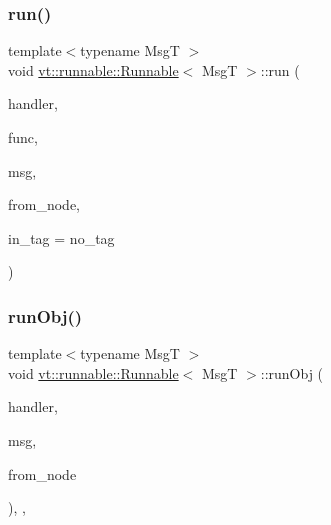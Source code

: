 \subsubsection{\texorpdfstring{run()}{run()}}
{\footnotesize\ttfamily template$<$typename MsgT $>$ \\
void \hyperlink{structvt_1_1runnable_1_1_runnable}{vt\+::runnable\+::\+Runnable}$<$ MsgT $>$\+::run (\begin{DoxyParamCaption}\item[{\hyperlink{namespacevt_af64846b57dfcaf104da3ef6967917573}{Handler\+Type}}]{handler,  }\item[{\hyperlink{namespacevt_a70e19bd64d031e65083c2125b2c65426}{Active\+Fn\+Ptr\+Type}}]{func,  }\item[{MsgT $\ast$}]{msg,  }\item[{\hyperlink{namespacevt_a866da9d0efc19c0a1ce79e9e492f47e2}{Node\+Type}}]{from\+\_\+node,  }\item[{\hyperlink{namespacevt_a84ab281dae04a52a4b243d6bf62d0e52}{Tag\+Type}}]{in\+\_\+tag = {\ttfamily no\+\_\+tag} }\end{DoxyParamCaption})\hspace{0.3cm}{\ttfamily [static]}}

\mbox{\label{structvt_1_1runnable_1_1_runnable_a2d5b3dd7e10957359b1d57d94b219e18}} 
\subsubsection{\texorpdfstring{run\+Obj()}{runObj()}}
{\footnotesize\ttfamily template$<$typename MsgT $>$ \\
void \hyperlink{structvt_1_1runnable_1_1_runnable}{vt\+::runnable\+::\+Runnable}$<$ MsgT $>$\+::run\+Obj (\begin{DoxyParamCaption}\item[{\hyperlink{namespacevt_af64846b57dfcaf104da3ef6967917573}{Handler\+Type}}]{handler,  }\item[{MsgT $\ast$}]{msg,  }\item[{\hyperlink{namespacevt_a866da9d0efc19c0a1ce79e9e492f47e2}{Node\+Type}}]{from\+\_\+node }\end{DoxyParamCaption})\hspace{0.3cm}{\ttfamily [inline]}, {\ttfamily [static]}, {\ttfamily [private]}}




